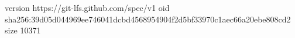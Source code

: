 version https://git-lfs.github.com/spec/v1
oid sha256:39d05d044969ee746041dcbd4568954904f2d5bf33970c1aec66a20ebe808cd2
size 10371
